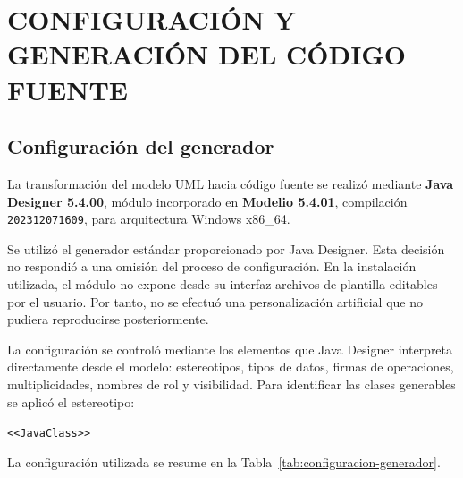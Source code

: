 \documentclass[10pt,a4paper,openany]{report}
\begin{document}
	
	
	\chapter{CONFIGURACIÓN Y GENERACIÓN DEL CÓDIGO FUENTE}
	
	\section{Configuración del generador}
	
	La transformación del modelo UML hacia código fuente se realizó mediante
	\textbf{Java Designer 5.4.00}, módulo incorporado en
	\textbf{Modelio 5.4.01}, compilación \texttt{202312071609}, para
	arquitectura Windows x86\_64.
	
	Se utilizó el generador estándar proporcionado por Java Designer. Esta
	decisión no respondió a una omisión del proceso de configuración. En la
	instalación utilizada, el módulo no expone desde su interfaz archivos de
	plantilla editables por el usuario. Por tanto, no se efectuó una
	personalización artificial que no pudiera reproducirse posteriormente.
	
	La configuración se controló mediante los elementos que Java Designer
	interpreta directamente desde el modelo: estereotipos, tipos de datos,
	firmas de operaciones, multiplicidades, nombres de rol y visibilidad.
	Para identificar las clases generables se aplicó el estereotipo:
	
	\begin{center}
		\texttt{\textless\textless JavaClass\textgreater\textgreater}
	\end{center}
	
	La configuración utilizada se resume en la
	Tabla~\ref{tab:configuracion-generador}.
	
\end{document}
